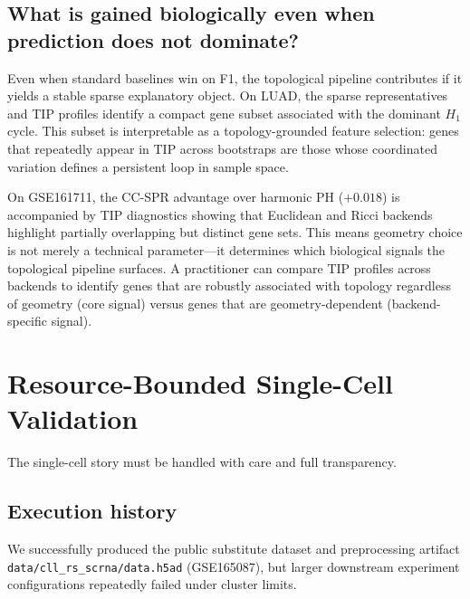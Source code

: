 \documentclass[11pt]{article}
\begin{document}
\subsection{What is gained biologically even when prediction does not dominate?}

Even when standard baselines win on F1, the topological pipeline contributes if it yields a stable sparse explanatory object.
On LUAD, the sparse representatives and TIP profiles identify a compact gene subset associated with the dominant $H_1$ cycle.
This subset is interpretable as a topology-grounded feature selection: genes that repeatedly appear in TIP across bootstraps are those whose coordinated variation defines a persistent loop in sample space.

On GSE161711, the CC-SPR advantage over harmonic PH ($+0.018$) is accompanied by TIP diagnostics showing that Euclidean and Ricci backends highlight partially overlapping but distinct gene sets.
This means geometry choice is not merely a technical parameter---it determines which biological signals the topological pipeline surfaces.
A practitioner can compare TIP profiles across backends to identify genes that are robustly associated with topology regardless of geometry (core signal) versus genes that are geometry-dependent (backend-specific signal).

\section{Resource-Bounded Single-Cell Validation}
\label{sec:scrna}

The single-cell story must be handled with care and full transparency.

\subsection{Execution history}

We successfully produced the public substitute dataset and preprocessing artifact \texttt{data/cll\_rs\_scrna/data.h5ad} (GSE165087), but larger downstream experiment configurations repeatedly failed under cluster limits.
\end{document}

